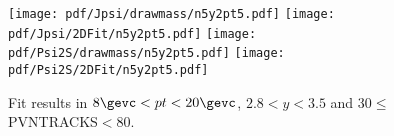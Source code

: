 \begin{figure}[H]
\begin{center}
\texttt{[image: pdf/Jpsi/drawmass/n5y2pt5.pdf]}
\texttt{[image: pdf/Jpsi/2DFit/n5y2pt5.pdf]}
\vspace*{-0.5cm}
\texttt{[image: pdf/Psi2S/drawmass/n5y2pt5.pdf]}
\texttt{[image: pdf/Psi2S/2DFit/n5y2pt5.pdf]}
\vspace*{-0.5cm}
\end{center}
\caption{Fit results in $8\gevc<pt<20\gevc$, $2.8<y<3.5$ and 30$\leq$PVNTRACKS$<$80.}
\label{Fitn5y2pt5}
\end{figure}
